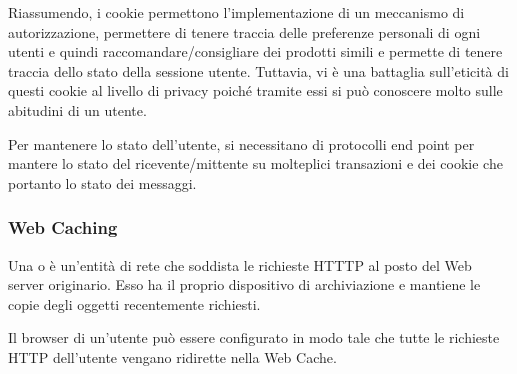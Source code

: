 \documentclass{book}
\newcommand{\tmtextbf}[1]{\text{{\bfseries{#1}}}}
\begin{document}
Riassumendo, i cookie permettono l'implementazione di un meccanismo di
autorizzazione, permettere di tenere traccia delle preferenze personali di
ogni utenti e quindi raccomandare/consigliare dei prodotti simili e permette
di tenere traccia dello stato della sessione utente. Tuttavia, vi {\`e} una
battaglia sull'eticit{\`a} di questi cookie al livello di privacy poich{\'e}
tramite essi si pu{\`o} conoscere molto sulle abitudini di un utente.

Per mantenere lo stato dell'utente, si necessitano di protocolli end point per
mantere lo stato del ricevente/mittente su molteplici transazioni e dei cookie
che portanto lo stato dei messaggi.

\subsubsection{Web Caching}

Una \tmtextbf{Web Cache} o \tmtextbf{proxy server} {\`e} un'entit{\`a} di rete
che soddista le richieste HTTTP al posto del Web server originario. Esso ha il
proprio dispositivo di archiviazione e mantiene le copie degli oggetti
recentemente richiesti.

Il browser di un'utente pu{\`o} essere configurato in modo tale che tutte le
richieste HTTP dell'utente vengano ridirette nella Web Cache.
\end{document}
